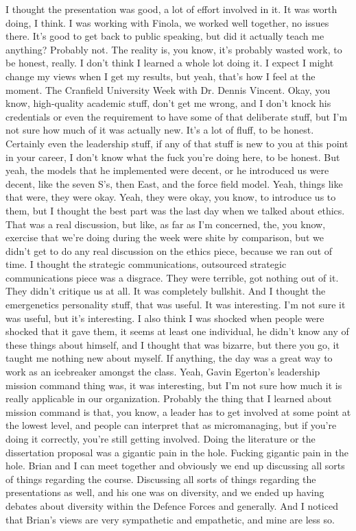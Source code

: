 I thought the presentation was good, a lot of effort involved in it. It was worth doing, I think. I was working with Finola, we worked well together, no issues there. It's good to get back to public speaking, but did it actually teach me anything? Probably not. The reality is, you know, it's probably wasted work, to be honest, really. I don't think I learned a whole lot doing it. I expect I might change my views when I get my results, but yeah, that's how I feel at the moment. The Cranfield University Week with Dr. Dennis Vincent. Okay, you know, high-quality academic stuff, don't get me wrong, and I don't knock his credentials or even the requirement to have some of that deliberate stuff, but I'm not sure how much of it was actually new. It's a lot of fluff, to be honest. Certainly even the leadership stuff, if any of that stuff is new to you at this point in your career, I don't know what the fuck you're doing here, to be honest. But yeah, the models that he implemented were decent, or he introduced us were decent, like the seven S's, then East, and the force field model. Yeah, things like that were, they were okay. Yeah, they were okay, you know, to introduce us to them, but I thought the best part was the last day when we talked about ethics. That was a real discussion, but like, as far as I'm concerned, the, you know, exercise that we're doing during the week were shite by comparison, but we didn't get to do any real discussion on the ethics piece, because we ran out of time. I thought the strategic communications, outsourced strategic communications piece was a disgrace. They were terrible, got nothing out of it. They didn't critique us at all. It was completely bullshit. And I thought the emergenetics personality stuff, that was useful. It was interesting. I'm not sure it was useful, but it's interesting. I also think I was shocked when people were shocked that it gave them, it seems at least one individual, he didn't know any of these things about himself, and I thought that was bizarre, but there you go, it taught me nothing new about myself. If anything, the day was a great way to work as an icebreaker amongst the class. Yeah, Gavin Egerton's leadership mission command thing was, it was interesting, but I'm not sure how much it is really applicable in our organization. Probably the thing that I learned about mission command is that, you know, a leader has to get involved at some point at the lowest level, and people can interpret that as micromanaging, but if you're doing it correctly, you're still getting involved. Doing the literature or the dissertation proposal was a gigantic pain in the hole. Fucking gigantic pain in the hole. Brian and I can meet together and obviously we end up discussing all sorts of things regarding the course. Discussing all sorts of things regarding the presentations as well, and his one was on diversity, and we ended up having debates about diversity within the Defence Forces and generally. And I noticed that Brian's views are very sympathetic and empathetic, and mine are less so.


